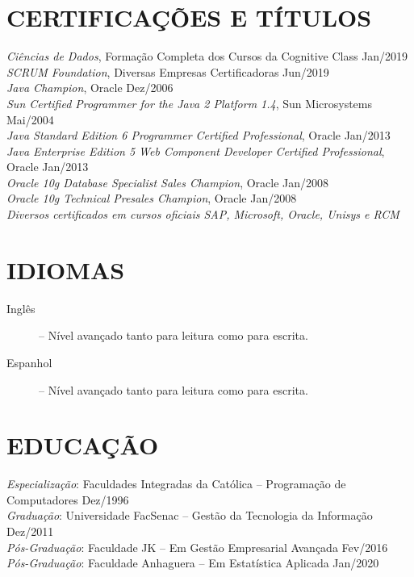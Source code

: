 \documentclass{res}
\begin{document}
\begin{resume}
\section{CERTIFICAÇÕES E TÍTULOS}
\vspace{8pt}
{\sl Ciências de Dados}, Formação Completa dos Cursos da Cognitive Class \hfill Jan/2019 \\
{\sl SCRUM Foundation}, Diversas Empresas Certificadoras \hfill Jun/2019 \\
{\sl Java Champion}, Oracle \hfill Dez/2006 \\
{\sl Sun Certified Programmer for the Java 2 Platform 1.4}, Sun Microsystems \hfill Mai/2004 \\
{\sl Java Standard Edition 6 Programmer Certified Professional}, Oracle \hfill Jan/2013 \\
{\sl Java Enterprise Edition 5 Web Component Developer Certified Professional}, Oracle \hfill Jan/2013 \\
{\sl Oracle 10g Database Specialist Sales Champion}, Oracle \hfill Jan/2008 \\
{\sl Oracle 10g Technical Presales Champion}, Oracle \hfill Jan/2008 \\
{\sl Diversos certificados em cursos oficiais SAP, Microsoft, Oracle, Unisys e RCM}

\section{IDIOMAS} 
\vspace{18pt}
\begin{description}
	\item[Inglês] -- Nível avançado tanto para leitura como para escrita.
	\item[Espanhol] -- Nível avançado tanto para leitura como para escrita.
\end{description}

\section{EDUCAÇÃO}
\vspace{8pt} 
{\sl Especialização}: Faculdades Integradas da Católica -- Programação de Computadores 
\hfill Dez/1996 \\
{\sl Graduação}: Universidade FacSenac -- Gestão da Tecnologia da Informação     
\hfill Dez/2011 \\
{\sl Pós-Graduação}: Faculdade JK -- Em Gestão Empresarial Avançada 
\hfill Fev/2016 \\
{\sl Pós-Graduação}: Faculdade Anhaguera -- Em Estatística Aplicada
\hfill Jan/2020


\end{resume}
\end{document}
